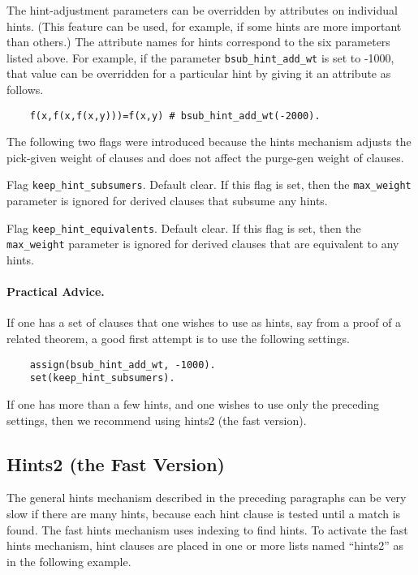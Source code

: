 \documentclass[11pt]{article}
\begin{document}
The hint-adjustment parameters can be overridden by attributes
on individual hints.  (This feature can be used, for example, if some hints
are more important than others.)  The attribute names for hints
correspond to the six parameters listed above.  For example, if
the parameter \verb:bsub_hint_add_wt: is set to -1000, that
value can be overridden for a particular hint by giving it
an attribute as follows.

{\small
\begin{verbatim}
    f(x,f(x,f(x,y)))=f(x,y) # bsub_hint_add_wt(-2000).
\end{verbatim}
}

The following two flags were introduced because the
hints mechanism adjusts the pick-given weight of clauses
and does not affect the purge-gen weight of clauses.

\noindent
Flag \verb:keep_hint_subsumers:.  Default clear.
If this flag is set, then the \verb:max_weight: parameter is
ignored for derived clauses that subsume any hints.

\noindent
Flag \verb:keep_hint_equivalents:.  Default clear.
If this flag is set, then the \verb:max_weight: parameter is
ignored for derived clauses that are equivalent to any hints.

\paragraph{Practical Advice.}  If one has a set of clauses that
one wishes to use as hints, say from a proof of a related theorem,
a good first attempt is to use the following settings.

\begin{verbatim}
    assign(bsub_hint_add_wt, -1000).
    set(keep_hint_subsumers).
\end{verbatim}
If one has more than a few hints, and one wishes to use only the preceding
settings, then we recommend using hints2 (the fast version).

\subsection{Hints2 (the Fast Version)}

The general hints mechanism described in the preceding paragraphs
can be very slow if there are many hints, because each hint
clause is tested until a match is found.  The fast hints mechanism
uses indexing to find hints.  To activate the fast hints
mechanism, hint clauses are placed in one or more lists named
``hints2'' as in the following example.
\end{document}
